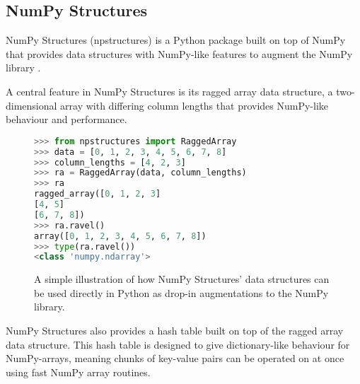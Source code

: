 \subsection{NumPy Structures} \label{background:npstructures}
NumPy Structures (npstructures) is a Python package built on top of NumPy that provides data structures with NumPy-like features to augment the NumPy library \cite{npstructures}.

A central feature in NumPy Structures is its ragged array data structure, a two-dimensional array with differing column lengths that provides NumPy-like behaviour and performance.
\begin{figure}[H]
\begin{lstlisting}[language=Python,style=console]
>>> from npstructures import RaggedArray
>>> data = [0, 1, 2, 3, 4, 5, 6, 7, 8]
>>> column_lengths = [4, 2, 3]
>>> ra = RaggedArray(data, column_lengths)
>>> ra
ragged_array([0, 1, 2, 3]
[4, 5]
[6, 7, 8])
>>> ra.ravel()
array([0, 1, 2, 3, 4, 5, 6, 7, 8])
>>> type(ra.ravel())
<class 'numpy.ndarray'>
\end{lstlisting}
\caption{
  A simple illustration of how NumPy Structures' data structures can be used directly in Python as drop-in augmentations to the NumPy library.
}
\label{background:npstructures:figure}
\end{figure}

NumPy Structures also provides a hash table built on top of the ragged array data structure.
This hash table is designed to give dictionary-like behaviour for NumPy-arrays, meaning chunks of key-value pairs can be operated on at once using fast NumPy array routines.
